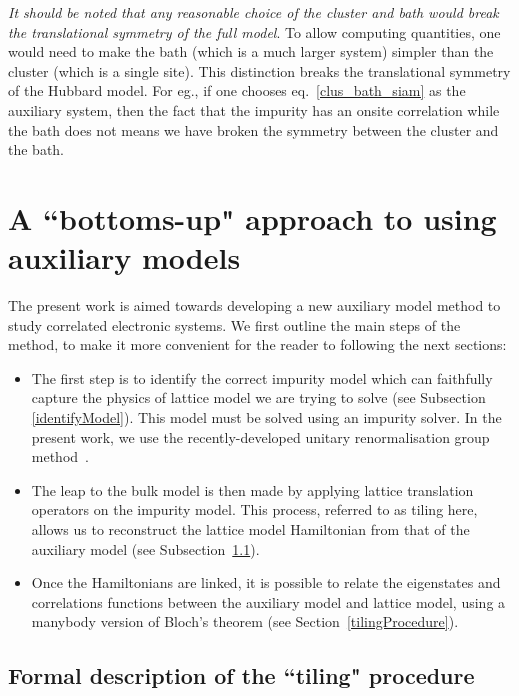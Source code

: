 \documentclass[reprint,hidelinks,onecolumn]{revtex4-2}
\begin{document}
\textit{It should be noted that any reasonable choice of the cluster and bath would break the translational symmetry of the full model}. To allow computing quantities, one would need to make the bath (which is a much larger system) simpler than the cluster (which is a single site). This distinction breaks the translational symmetry of the Hubbard model. For eg., if one chooses eq.~\ref{clus_bath_siam} as the auxiliary system, then the fact that the impurity has an onsite correlation while the bath does not means we have broken the symmetry between the cluster and the bath.

\section{A ``bottoms-up" approach to using auxiliary models}

The present work is aimed towards developing a new auxiliary model method to study correlated electronic systems. We first outline the main steps of the method, to make it more convenient for the reader to following the next sections:
\begin{itemize}
	\item The first step is to identify the correct impurity model which can faithfully capture the physics of lattice model we are trying to solve (see Subsection \ref{identifyModel}). This model must be solved using an impurity solver. In the present work, we use the recently-developed unitary renormalisation group method~\cite{anirbanmott1,anirbanmott2,anirbanurg1,anirbanurg2,siddharthacpi,santanukagome}.
	\item The leap to the bulk model is then made by applying lattice translation operators on the impurity model. This process, referred to as tiling here, allows us to reconstruct the lattice model Hamiltonian from that of the auxiliary model (see Subsection~\ref{tilingsubsection}).
	\item Once the Hamiltonians are linked, it is possible to relate the eigenstates and correlations functions between the auxiliary model and lattice model, using a manybody version of Bloch's theorem (see Section~\ref{tilingProcedure}).
\end{itemize}

\subsection{Formal description of the ``tiling" procedure}\label{tilingsubsection}
\end{document}
